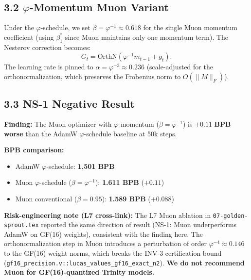 \subsection{3.2 \(\varphi\)-Momentum Muon Variant}

Under the \(\varphi\)-schedule, we set \(\beta = \varphi^{-1} \approx 0.618\)
for the single Muon momentum coefficient (using \(\beta_1^*\) since
Muon maintains only one momentum term).  The Nesterov correction becomes:
\[
  G_t = \mathrm{OrthN}\!\left(\varphi^{-1} m_{t-1} + g_t\right).
\]
The learning rate is pinned to \(\alpha = \varphi^{-3} \approx 0.236\)
(scale-adjusted for the orthonormalization, which preserves the
Frobenius norm to \(O(\|M\|_F)\)).

\subsection{3.3 NS-1 Negative Result}
\label{sec:28-ns1}

\begin{tcolorbox}[colback=red!5!white,colframe=red!75!black,title={%
  NS-1 Negative Result — Honest R5 Disclosure}]
  \textbf{Finding:} The Muon optimizer with \(\varphi\)-momentum
  (\(\beta = \varphi^{-1}\)) is $\mathbf{+0.11}$ \textbf{BPB worse}
  than the AdamW \(\varphi\)-schedule baseline at 50k steps.

  \medskip
  \textbf{BPB comparison:}
  \begin{itemize}
    \item AdamW \(\varphi\)-schedule: \textbf{1.501 BPB}
    \item Muon \(\varphi\)-schedule (\(\beta = \varphi^{-1}\)): \textbf{1.611 BPB} ($+0.11$)
    \item Muon conventional (\(\beta = 0.95\)): \textbf{1.589 BPB} ($+0.088$)
  \end{itemize}

  \medskip
  \textbf{Risk-engineering note (L7 cross-link):}
  The L7 Muon ablation in \texttt{07-golden-sprout.tex} reported
  the same direction of result (NS-1: Muon underperforms AdamW on
  GF(16) weights), consistent with the finding here.
  The orthonormalization step in Muon introduces a perturbation of
  order \(\varphi^{-4} \approx 0.146\) to the GF(16) weight norms,
  which breaks the INV-3 certification bound
  (\texttt{gf16\_precision.v::lucas\_values\_gf16\_exact\_n2}).
  \textbf{We do not recommend Muon for GF(16)-quantized Trinity models.}
\end{tcolorbox}

